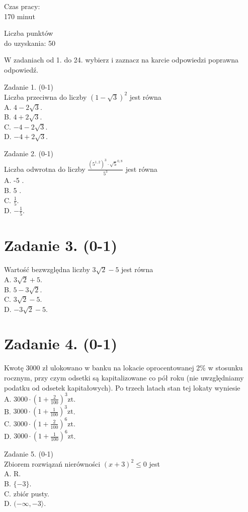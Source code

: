 \documentclass[10pt]{article}
\begin{document}
Czas pracy:\\
170 minut

Liczba punktów\\
do uzyskania: 50

W zadaniach od 1. do 24. wybierz i zaznacz na karcie odpowiedzi poprawna odpowiedź.

Zadanie 1. (0-1)\\
Liczba przeciwna do liczby \((1-\sqrt{3})^{2}\) jest równa\\
A. \(4-2 \sqrt{3}\).\\
B. \(4+2 \sqrt{3}\).\\
C. \(-4-2 \sqrt{3}\).\\
D. \(-4+2 \sqrt{3}\).

Zadanie 2. (0-1)\\
Liczba odwrotna do liczby \(\frac{\left(5^{1,2}\right)^{3} \cdot \sqrt{5}^{0,8}}{5^{3}}\) jest równa\\
A. -5 .\\
B. 5 .\\
C. \(\frac{1}{5}\).\\
D. \(-\frac{1}{5}\).

\section*{Zadanie 3. (0-1)}
Wartość bezwzględna liczby \(3 \sqrt{2}-5\) jest równa\\
A. \(3 \sqrt{2}+5\).\\
B. \(5-3 \sqrt{2}\).\\
C. \(3 \sqrt{2}-5\).\\
D. \(-3 \sqrt{2}-5\).

\section*{Zadanie 4. (0-1)}
Kwotę 3000 zł ulokowano w banku na lokacie oprocentowanej 2\% w stosunku rocznym, przy czym odsetki są kapitalizowane co pół roku (nie uwzględniamy podatku od odsetek kapitałowych). Po trzech latach stan tej lokaty wyniesie\\
A. \(3000 \cdot\left(1+\frac{2}{100}\right)^{3} \mathrm{zt}\).\\
B. \(3000 \cdot\left(1+\frac{1}{100}\right)^{3} \mathrm{zt}\).\\
C. \(3000 \cdot\left(1+\frac{2}{100}\right)^{6} \mathrm{zt}\).\\
D. \(3000 \cdot\left(1+\frac{1}{100}\right)^{6} \mathrm{zt}\).

Zadanie 5. (0-1)\\
Zbiorem rozwiązań nierówności \((x+3)^{2} \leqslant 0\) jest\\
A. R.\\
B. \(\{-3\}\).\\
C. zbiór pusty.\\
D. \((-\infty,-3\rangle\).
\end{document}
